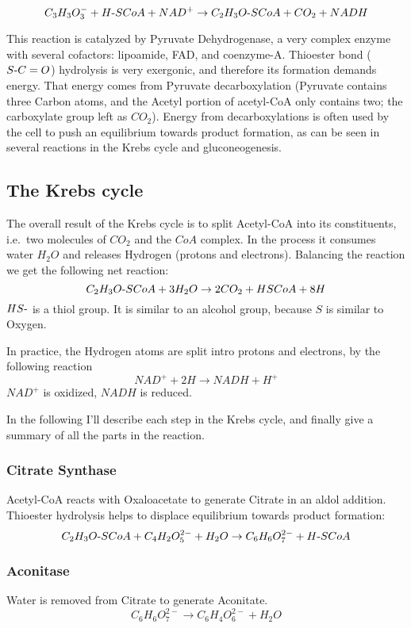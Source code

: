 \documentclass[a4paper,14pt]{extarticle}
\def\mhyphen{{\hbox{-}}}
\begin{document}
\[
    C_3H_3O_3^- + H{\mhyphen}SCoA + NAD^+ \rightarrow
    C_2H_3O{\mhyphen}SCoA + CO_2 + NADH
\]

This reaction is catalyzed by Pyruvate Dehydrogenase, a very complex enzyme with several
cofactors: lipoamide, FAD, and coenzyme-A. Thioester bond ($S{\mhyphen}C=O$) hydrolysis is
very exergonic, and therefore its formation demands energy. That energy comes from
Pyruvate decarboxylation (Pyruvate contains three Carbon atoms, and the Acetyl portion of
acetyl-CoA only contains two; the carboxylate group left as $CO_2$). Energy from
decarboxylations is often used by the cell to push an equilibrium towards product
formation, as can be seen in several reactions in the Krebs cycle and gluconeogenesis.

\subsection{The Krebs cycle}
The overall result of the Krebs cycle is to split Acetyl-CoA into its constituents, i.e.\
two molecules of $CO_2$ and the $CoA$ complex. In the process it consumes water $H_2O$ and
releases Hydrogen (protons and electrons). Balancing the reaction we get the following
net reaction:
\[
    C_2H_3O{\mhyphen}SCoA + 3H_2O \rightarrow 2CO_2 + HSCoA + 8H
\]
$HS{\mhyphen}$ is a thiol group. It is similar to an alcohol group, because $S$ is similar to
Oxygen.

In practice, the Hydrogen atoms are split intro protons and electrons, by the following
reaction
\[
    NAD^+ + 2H \rightarrow NADH + H^+
\]
$\mathit{NAD^+}$ is oxidized, $\mathit{NADH}$ is reduced.

In the following I'll describe each step in the Krebs cycle, and finally give a summary of
all the parts in the reaction.

\subsubsection{Citrate Synthase}
Acetyl-CoA reacts with Oxaloacetate to generate Citrate in an aldol addition.
Thioester hydrolysis helps to displace equilibrium towards product formation:
\[
    C_2H_3O{\mhyphen}SCoA + C_4H_2O_5^{2-} + H_2O \rightarrow
    C_6H_6O_7^{2-} + H{\mhyphen}SCoA
\]

\subsubsection{Aconitase}
Water is removed from Citrate to generate Aconitate.
\[
    C_6H_6O_7^{2-} \rightarrow C_6H_4O_6^{2-} + H_2O
\]
\end{document}
